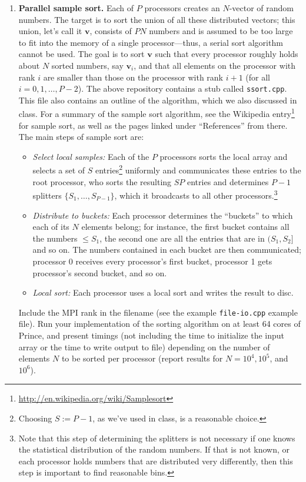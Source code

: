 \documentclass[12pt]{article}
\newcommand{\bs}{\boldsymbol}
\begin{document}
\begin{enumerate}
\item {\bf Parallel sample sort.}  Each of $P$ processors creates
  an $N$-vector of random numbers. The target is to sort the union of
  all these distributed vectors; this union, let's call it $\bs v$,
  consists of $PN$ numbers and is assumed to be too large to fit into
  the memory of a single processor---thus, a serial sort algorithm
  cannot be used.  The goal is to sort $\bs v$ such that every
  processor roughly holds about $N$ sorted numbers, say $\bs v_i$, and
  that all elements on the processor with rank $i$ are smaller
  than those on the processor with rank $i+1$ (for all $i=0,1,\ldots,
  P-2$).  The above repository contains a stub called
  \texttt{ssort.cpp}. This file also contains an outline of the
  algorithm, which we also discussed in class. For a summary of the
  sample sort algorithm, see the Wikipedia
  entry\footnote{\url{http://en.wikipedia.org/wiki/Samplesort}} for
  sample sort, as well as the pages linked under ``References'' from
  there. The main steps of sample sort are:
\begin{itemize}
\item \emph{Select local samples:} Each of the $P$ processors sorts
  the local array and selects
  a set of $S$ entries\footnote{Choosing $S:=P-1$, as we've used in
    class, is a reasonable choice.} uniformly and communicates these entries to the
  root processor, who sorts the resulting $SP$ entries and determines
  $P-1$ splitters $\{S_1,\ldots,S_{P-1}\}$, which it broadcasts to all
  other processors.\footnote{Note that this step of determining the
    splitters is not necessary if one knows the statistical distribution of the
    random numbers. If that is not known, or each processor holds
    numbers that are distributed very differently, then this step is
    important to find reasonable bins.} 
\item \emph{Distribute to buckets:} Each processor determines the
  ``buckets'' to which each of its $N$ elements belong; for instance,
  the first bucket contains all the numbers $\le S_1$, the second one
  are all the entries that are in $(S_1,S_2]$ and so on. The numbers
    contained in each bucket are then communicated; processor 0
    receives every processor's first bucket, processor 1 gets
    processor's second bucket, and so on.
\item \emph{Local sort:} Each processor uses a local sort and writes
  the result to disc.
\end{itemize}
 Include the MPI rank in the filename (see the example
 \texttt{file-io.cpp} example file).  Run your implementation of
 the sorting algorithm on at least 64 cores of Prince, and present
 timings (not including the time to initialize the input array or the
 time to write output to file) depending on the number of elements $N$
 to be sorted per processor (report results for $N=10^4, 10^5$, and $10^6$).


\end{enumerate}
\end{document}
